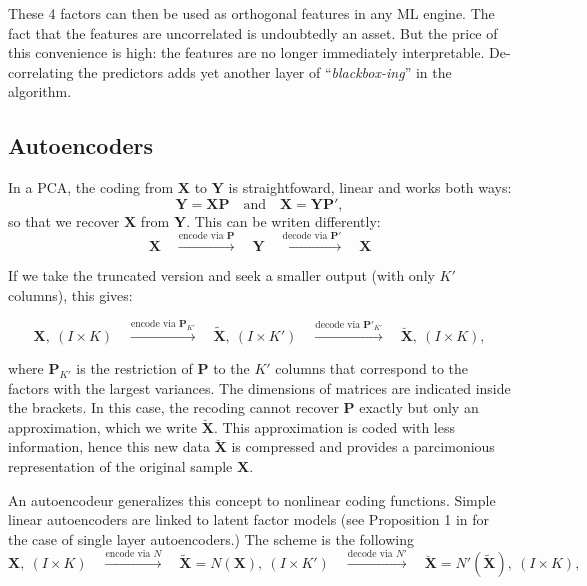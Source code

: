 \documentclass[]{krantz}
\theoremstyle{definition}
\theoremstyle{definition}
\theoremstyle{definition}
\theoremstyle{remark}
\begin{document}
\normalsize

These 4 factors can then be used as orthogonal features in any ML
engine. The fact that the features are uncorrelated is undoubtedly an
asset. But the price of this convenience is high: the features are no
longer immediately interpretable. De-correlating the predictors adds yet
another layer of ``\emph{blackbox-ing}'' in the algorithm.

\hypertarget{ae}{%
\subsection{Autoencoders}\label{ae}}

In a PCA, the coding from \(\textbf{X}\) to \(\textbf{Y}\) is
straightfoward, linear and works both ways:
\[\textbf{Y}=\textbf{X}\textbf{P} \quad \text{and} \quad \textbf{X}=\textbf{YP}',\]
so that we recover \(\textbf{X}\) from \(\textbf{Y}\). This can be
writen differently: \begin{equation}
\label{eq:pcascheme}
\textbf{X} \quad \overset{\text{encode via }\textbf{P}}{\longrightarrow} \quad \textbf{Y} \quad \overset{\text{decode via } \textbf{P}'}{\longrightarrow} \quad \textbf{X}
\end{equation}

If we take the truncated version and seek a smaller output (with only
\(K'\) columns), this gives:

\begin{equation}
\label{eq:pcaschem2}
\textbf{X}, \ (I\times K) \quad \overset{\text{encode via }\textbf{P}_{K'}}{\longrightarrow} \quad \tilde{\textbf{X}}, \ (I \times K') \quad \overset{\text{decode via } \textbf{P}'_{K'}}{\longrightarrow} \quad \breve{\textbf{X}},\ (I \times K),
\end{equation}

where \(\textbf{P}_{K'}\) is the restriction of \(\textbf{P}\) to the
\(K'\) columns that correspond to the factors with the largest
variances. The dimensions of matrices are indicated inside the brackets.
In this case, the recoding cannot recover \(\textbf{P}\) exactly but
only an approximation, which we write \(\breve{\textbf{X}}\). This
approximation is coded with less information, hence this new data
\(\breve{\textbf{X}}\) is compressed and provides a parcimonious
representation of the original sample \(\textbf{X}\).

An autoencodeur generalizes this concept to nonlinear coding functions.
Simple linear autoencoders are linked to latent factor models (see
Proposition 1 in \cite{gu2019autoencoder} for the case of single layer
autoencoders.) The scheme is the following \begin{equation}
\label{eq:aescheme2}
\textbf{X},\ (I\times K) \quad \overset{\text{encode via } N} {\longrightarrow} \quad \tilde{\textbf{X}}=N(\textbf{X}), \ (I \times K') \quad \overset{\text{decode via } N'}{\longrightarrow} \quad \breve{\textbf{X}}=N'(\tilde{\textbf{X}}), \ (I \times K),
\end{equation}
\end{document}
